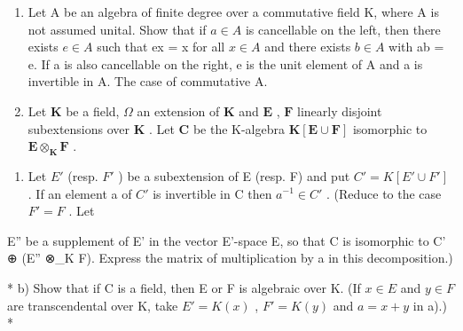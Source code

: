 \begin{enumerate}
\def\labelenumi{\arabic{enumi})}
\setcounter{enumi}{2}
\item
  Let A be an algebra of finite degree over a commutative field K, where A is not assumed unital. Show that if \(a \in A\) is cancellable on the left, then there exists \(e \in A\) such that ex = x for all \(x \in A\) and there exists \(b \in A\) with ab = e. If a is also cancellable on the right, e is the unit element of A and a is invertible in A. The case of commutative A.
\item
  Let \(\mathbf{K}\) be a field, \(\Omega\) an extension of \(\mathbf{K}\) and \(\mathbf{E}\) , \(\mathbf{F}\) linearly disjoint subextensions over \(\mathbf{K}\) . Let \(\mathbf{C}\) be the K-algebra \(\mathbf{K}[\mathbf{E} \cup \mathbf{F}]\) isomorphic to \(\mathbf{E} \otimes_{\mathbf{K}} \mathbf{F}\) .
\end{enumerate}

\begin{enumerate}
\def\labelenumi{\alph{enumi})}
\tightlist
\item
  Let \(E'\) (resp. \(F'\) ) be a subextension of E (resp. F) and put \(C' = K[E' \cup F']\) . If an element a of \(C'\) is invertible in C then \(a^{-1} \in C'\) . (Reduce to the case \(F' = F\) . Let
\end{enumerate}

E'' be a supplement of E' in the vector E'-space E, so that C is isomorphic to C' ⊕ (E'' ⊗\_K F). Express the matrix of multiplication by a in this decomposition.)

* b) Show that if C is a field, then E or F is algebraic over K. (If \(x \in E\) and \(y \in F\) are transcendental over K, take \(E' = K(x)\) , \(F' = K(y)\) and \(a = x + y\) in a).) *
